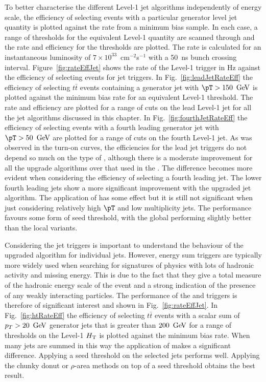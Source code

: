 To better characterise the different Level-1 jet algorithms independently of energy
scale, the efficiency of selecting events with a particular generator
level jet quantity is plotted against the rate from a minimum bias
sample. In each case, a range of thresholds for the equivalent Level-1
quantity are scanned through and the rate and efficiency for the
thresholds are plotted. The rate is calculated for an instantaneous luminosity
of $7\times10^{33}$~cm$^{-2}$s$^{-1}$ with a 50~ns \LHC bunch crossing
interval. Figure~\ref{fig:rateEffJet} shows the rate of the Level-1
trigger in Hz against the efficiency of selecting events for jet
triggers. In Fig.~\ref{fig:leadJetRateEff} the efficiency of
selecting $t\bar{t}$ events containing a generator jet with
$\pT>150~\gev$ is plotted against the minimum bias rate for an
equivalent Level-1 threshold. The rate and efficiency are plotted for
a range of cuts on the lead Level-1 jet for all the jet algorithms
discussed in this chapter. In Fig.~\ref{fig:fourthJetRateEff} the
efficiency of selecting events with a fourth leading generator jet
with $\pT>50~\gev$ are plotted for a range of cuts on the fourth Level-1
jet. As was observed in the turn-on curves, the efficiencies for the
lead jet triggers do not depend so much on the type of \PUS, although
there is a moderate improvement for all the upgrade algorithms over
that used in the \GCT. The difference becomes more evident when
considering the efficiency of selecting a fourth leading jet. The
lower \pT fourth leading jets show a more significant improvement with
the upgraded jet algorithm. The application of \PUS has some effect
but it is still not significant when just considering relatively high
$\pT$ and low multiplicity jets. The performance favours some form of
seed threshold, with the global \PUS performing slightly better than
the local variants.

Considering the jet triggers is important to understand the
behaviour of the upgraded algorithm for individual jets. However,
energy sum triggers are typically more widely used when searching for
signatures of \BSM physics with lots of hadronic activity and missing
energy. This is due to the fact that they give a total measure of the
hadronic energy scale of the event and a strong indication of the
presence of any weakly interacting particles. The performance of the
\HT and \MHT triggers is therefore of significant interest and shown
in Fig.~\ref{fig:rateEffJet}. In Fig.~\ref{fig:htRateEff} the
efficiency of selecting $t\bar{t}$ events with a scalar sum of $p_T>20~\mathrm{\,Ge\kern -0.1em V}$
generator jets that is greater than $200~\mathrm{\,Ge\kern -0.1em V}$ for a range of
thresholds on the Level-1 $\mbox{$H_\text{T}$}$ is plotted against the minimum bias
rate. When many jets are summed in this way the application of \PUS
makes a significant difference. Applying a seed threshold on the
selected jets performs well. Applying the chunky donut or
$\rho$-area \PUS methods on top of a seed threshold obtains the best result.

